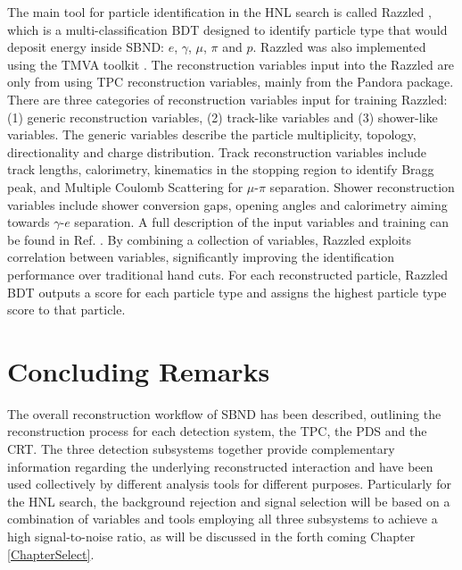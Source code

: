 The main tool for particle identification in the HNL search is called Razzled \cite{razzled}, which is a multi-classification BDT designed to identify particle type that would deposit energy inside SBND: $e$, $\gamma$, $\mu$, $\pi$ and $p$.
Razzled was also implemented using the TMVA toolkit \cite{tmva}.
The reconstruction variables input into the Razzled are only from using TPC reconstruction variables, mainly from the Pandora package.
There are three categories of reconstruction variables input for training Razzled: (1) generic reconstruction variables, (2) track-like variables and (3) shower-like variables.
The generic variables describe the particle multiplicity, topology, directionality and charge distribution.
Track reconstruction variables include track lengths, calorimetry, kinematics in the stopping region to identify Bragg peak, and Multiple Coulomb Scattering for $\mu$-$\pi$ separation.
Shower reconstruction variables include shower conversion gaps, opening angles and calorimetry aiming towards $\gamma$-$e$ separation.
A full description of the input variables and training can be found in Ref. \cite{EdPhD}.
By combining a collection of variables, Razzled exploits correlation between variables, significantly improving the identification performance over traditional hand cuts.
For each reconstructed particle, Razzled BDT outputs a score for each particle type and assigns the highest particle type score to that particle.

\section{Concluding Remarks}
\label{sec:reco_concluding_remarks}

The overall reconstruction workflow of SBND has been described, outlining the reconstruction process for each detection system, the TPC, the PDS and the CRT.
The three detection subsystems together provide complementary information regarding the underlying reconstructed interaction and have been used collectively by different analysis tools for different purposes.
Particularly for the HNL search, the background rejection and signal selection will be based on a combination of variables and tools employing all three subsystems to achieve a high signal-to-noise ratio, as will be discussed in the forth coming Chapter \ref{ChapterSelect}.
